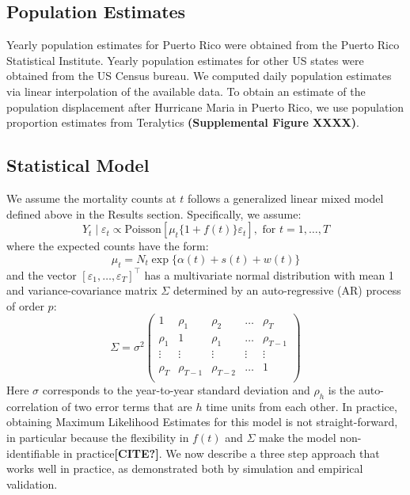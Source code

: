 \documentclass[11pt]{article}
\begin{document}
\subsection{Population Estimates}
\label{subsec:population}
Yearly population estimates for Puerto Rico were obtained from the Puerto Rico Statistical Institute. Yearly population estimates for other US states were obtained from the US Census bureau. We computed daily population estimates via linear interpolation of the available data. To obtain an estimate of the population displacement after Hurricane Maria in Puerto Rico, we use population proportion estimates from Teralytics \textbf{(Supplemental Figure XXXX)}.

\subsection{Statistical Model}
\label{subsec:statistical-model}
We assume the mortality counts at $t$ follows a generalized linear mixed model defined above in the Results section. Specifically, we assume:
\begin{equation*}
    Y_t \mid \varepsilon_t \propto \mbox{Poisson}[ \mu_t \{1 + f(t)\}  \varepsilon_t ], \mbox{ for } t = 1, \dots,T 
\end{equation*}
where the expected counts have the form:
\begin{equation*}
    \mu_t =N_t  \exp\{ \alpha(t) + s(t) + w(t) \}
\end{equation*}
and the vector $[\varepsilon_1, \ldots, \varepsilon_T]^\top$ has a multivariate normal distribution with mean 1 and variance-covariance matrix $\Sigma$ determined by an auto-regressive (AR) process of order $p$:
\begin{equation*}
    \Sigma = \sigma^2
    \begin{pmatrix} 1 & \rho_1 & \rho_{2} & \dots & \rho_{T} \\ 
    \rho_{1} & 1 & \rho_{1} & \ldots & \rho_{T-1} \\
    \vdots & \vdots & \vdots & \vdots & \vdots \\
    \rho_{T} & \rho_{T-1} & \rho_{T-2} & \dots & 1 \\ 
    \end{pmatrix}
\end{equation*}
Here $\sigma$ corresponds to the year-to-year standard deviation and $\rho_h$ is the auto-correlation of two error terms that are $h$ time units from each other. In practice, obtaining Maximum Likelihood Estimates for this model is not straight-forward, in particular because the flexibility in $f(t)$ and $\Sigma$ make the model non-identifiable in practice\textbf{[CITE?]}. We now describe a three step approach that works well in practice, as demonstrated both by simulation and empirical validation.
\end{document}
